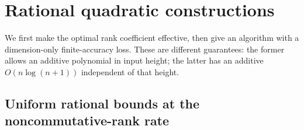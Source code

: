 \section{Rational quadratic constructions}\label{sec:rational-quadratic}

We first make the optimal rank coefficient effective, then give an
algorithm with a dimension-only finite-accuracy loss. These are different
guarantees: the former allows an additive polynomial in input height;
the latter has an additive $O(n\log(n+1))$ independent of that height.

\subsection{Uniform rational bounds at the noncommutative-rank rate}

